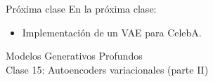 \documentclass{beamer}
\begin{document}
\begin{frame}{Próxima clase}
    En la próxima clase:
    \begin{itemize}
        \item Implementación de un VAE para CelebA.
    \end{itemize}
\end{frame}

\begin{frame}
    \centering
    \Large{Modelos Generativos Profundos}\\
    \large{Clase 15: Autoencoders variacionales (parte II)}
\end{frame}
\end{document}
